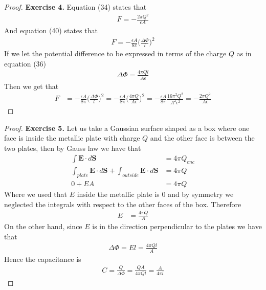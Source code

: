 \documentclass[11pt]{article}
\theoremstyle{definition}
\begin{document}
\cleardoublepage
\begin{proof}{\textbf{Exercise 4.}}
Equation (34) states that
\begin{align*}
    F = -\frac{2\pi Q^2}{\epsilon A}
\end{align*}
And equation (40) states that
\begin{align*}
    F = -\frac{\epsilon A}{8\pi}\bigg(\frac{\Delta \Phi}{l}\bigg)^2
\end{align*}
If we let the potential difference to be expressed in terms of the charge $Q$
as in equation (36)
\begin{align*}
    \Delta\Phi = \frac{4\pi Ql}{A\epsilon}
\end{align*}
Then we get that
\begin{align*}
    F &= -\frac{\epsilon A}{8\pi}\bigg(\frac{\Delta \Phi}{l}\bigg)^2
    = -\frac{\epsilon A}{8\pi}\bigg(\frac{4\pi Q}{A\epsilon}\bigg)^2
    = -\frac{\epsilon A}{8\pi}\frac{16\pi^2 Q^2}{A^2\epsilon^2}
    = -\frac{2\pi Q^2}{A\epsilon}
\end{align*}
\end{proof}

\cleardoublepage
\begin{proof}{\textbf{Exercise 5.}}
Let us take a Gaussian surface shaped as a box where one face is inside the
metallic plate with charge $Q$ and the other face is between the two plates,
then by Gauss law we have that
\begin{align*}
    \int \bm{E}\cdot d\bm{S} &= 4\pi Q_{enc}\\
    \int_{plate} \bm{E}\cdot d\bm{S} + \int_{outside} \bm{E}\cdot d\bm{S} &= 4\pi Q\\
    0 + E A &= 4\pi Q
\end{align*}
Where we used that $E$ inside the metallic plate is 0 and by symmetry we
neglected the integrals with respect to the other faces of the box.
Therefore
\begin{align*}
    E &= \frac{4\pi Q}{A}
\end{align*}
On the other hand, since $E$ is in the direction perpendicular to the plates
we have that
\begin{align*}
    \Delta \Phi = E l = \frac{4\pi Q l}{A}
\end{align*}
Hence the capacitance is 
\begin{align*}
    C = \frac{Q}{\Delta\Phi} = \frac{QA}{4\pi Q l} = \frac{A}{4\pi l}
\end{align*}
\end{proof}
\end{document}

